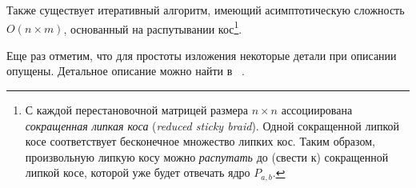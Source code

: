 

Также существует итеративный алгоритм, имеющий асимптотическую сложность $O(n \times m)$, основанный на распутывании кос\footnote{С каждой перестановочной матрицей размера $n \times n$ ассоциирована \emph{сокращенная липкая коса} (\emph{reduced sticky braid}). Одной {сокращенной липкой косе} соответствует бесконечное множество липких кос. Таким образом, произвольную липкую косу можно  \emph{распутать} до  (свести к) {сокращенной липкой косе}, которой уже будет отвечать ядро $P_{a,b}$.
}.






Еще раз отметим, что для простоты изложения некоторые детали при описании опущены. Детальное описание можно найти в ~\cite{alex2007semilocal}.

